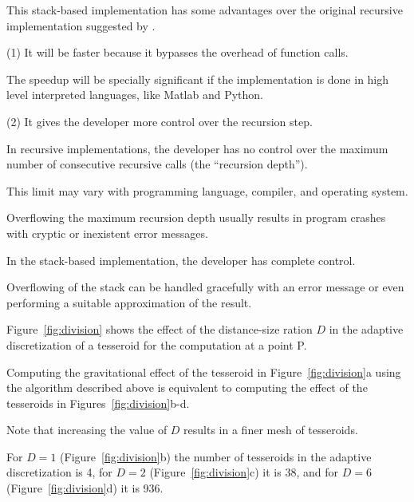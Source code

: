 \documentclass[paper,twocolumn]{geophysics}
\begin{document}
This stack-based implementation has some advantages over the original recursive
implementation suggested by \citet{Li2011}.

(1) It will be faster because it bypasses the overhead of function calls.

The speedup will be specially significant if the implementation is done
in high level interpreted languages, like Matlab and Python.

(2) It gives the developer more control over the recursion step.

In recursive implementations,
the developer has no control over the maximum number of consecutive
recursive calls (the ``recursion depth'').

This limit may vary with programming language, compiler, and operating system.

Overflowing the maximum recursion depth usually results in program
crashes with cryptic or inexistent error messages.

In the stack-based implementation, the developer has complete control.

Overflowing of the stack can be handled gracefully with an error message or
even performing a suitable approximation of the result.



Figure~\ref{fig:division} shows the effect of the distance-size ration $D$
in the adaptive discretization of a tesseroid for the computation at a point P.

Computing the gravitational effect of the tesseroid in
Figure~\ref{fig:division}a using the algorithm described above
is equivalent to computing the effect of the tesseroids in
Figures~\ref{fig:division}b-d.

Note that increasing the value of $D$ results in a finer mesh of tesseroids.

For $D = 1$ (Figure~\ref{fig:division}b) the number of tesseroids in the
adaptive discretization is 4,
for $D = 2$ (Figure~\ref{fig:division}c) it is 38,
and for $D = 6$ (Figure~\ref{fig:division}d) it is 936.
\end{document}
